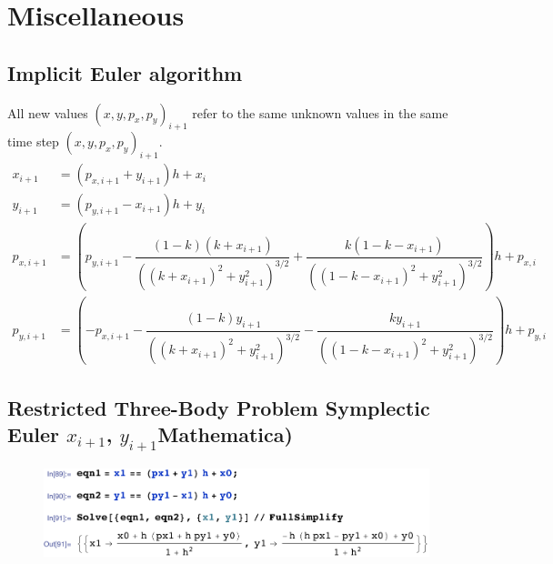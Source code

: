 \chapter{Miscellaneous} \label{app:misc}

\section{Implicit Euler algorithm} \label{app:implicit_euler}
All new values $(x,y,p_x,p_y)_{i+1}$ refer to the same unknown values in the same time step $(x,y,p_x,p_y)_{i+1}$.
\begin{align}
x_{i+1} &= (p_{x,i+1} + y_{i+1})h + x_{i} \\[0.2cm]
y_{i+1} &= (p_{y,i+1} - x_{i+1})h + y_{i} \\[0.2cm]
p_{x,i+1} &= \left(p_{y,i+1} - \dfrac{(1-k)(k+x_{i+1})}{((k+x_{i+1})^2+y_{i+1}^2)^{3/2}} + \dfrac{k(1-k-x_{i+1})}{((1-k-x_{i+1})^2+y_{i+1}^2)^{3/2}}\right)h + p_{x,i} \\[0.2cm]
p_{y,i+1} &= \left(-p_{x,i+1} - \dfrac{(1-k)y_{i+1}}{((k+x_{i+1})^2+y_{i+1}^2)^{3/2}} - \dfrac{k y_{i+1}}{((1-k-x_{i+1})^2+y_{i+1}^2)^{3/2}}\right)h + p_{y,i}
\end{align}

\section{Restricted Three-Body Problem Symplectic Euler \texorpdfstring{$x_{i+1}$, $y_{i+1}$} (Mathematica)} \label{app:r3b-symplectic-euler}
\begin{figure}[h!]
\centering 
\includegraphics[scale=0.8]{appendices/Miscellaneous/symplectic_euler_derivation.pdf}
\end{figure}

\newpage

